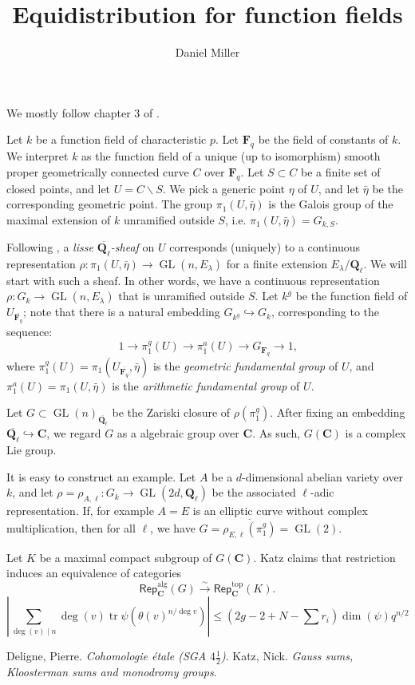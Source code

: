 \documentclass{article}
\title{Equidistribution for function fields}
\author{Daniel Miller}
\DeclareMathOperator{\gl}{GL}
\newcommand{\dC}{\mathbf{C}}
\newcommand{\dF}{\mathbf{F}}
\newcommand{\dQ}{\mathbf{Q}}
\begin{document}
\maketitle




We mostly follow chapter 3 of \cite{ka}.

Let $k$ be a function field of characteristic $p$. Let $\dF_q$ be the field of 
constants of $k$. We interpret $k$ as the function field of a unique (up to 
isomorphism) smooth proper geometrically connected curve $C$ over $\dF_q$. Let 
$S\subset C$ be a finite set of closed points, and let $U=C\smallsetminus S$. 
We pick a generic point $\eta$ of $U$, and let $\bar\eta$ be the corresponding 
geometric point. The group $\pi_1(U,\bar\eta)$ is the Galois group of the 
maximal extension of $k$ unramified outside $S$, i.e. 
$\pi_1(U,\bar\eta)=G_{k,S}$. 

Following \cite[2.2.4]{de}, a \emph{lisse $\overline{\dQ_\ell}$-sheaf} on $U$ 
corresponds (uniquely) to a continuous representation 
$\rho:\pi_1(U,\bar\eta) \to \gl(n,E_\lambda)$ for a finite extension 
$E_\lambda/\dQ_\ell$. We will start with such a sheaf. In other words, we have 
a continuous representation $\rho:G_k \to \gl(n,E_\lambda)$ that is unramified 
outside $S$. Let $k^g$ be the function field of $U_{\overline{\dF_q}}$; note 
that there is a natural embedding $G_{k^g}\hookrightarrow G_k$, corresponding 
to the sequence:
\[
  1 \to \pi_1^g(U) \to \pi_1^a(U) \to G_{\dF_q} \to 1\text{,}
\]
where $\pi_1^g(U)=\pi_1(U_{\overline{\dF_q}},\bar\eta)$ is the \emph{geometric 
fundamental group} of $U$, and $\pi_1^a(U)=\pi_1(U,\bar\eta)$ is the 
\emph{arithmetic fundamental group} of $U$. 

Let $G\subset \gl(n)_{\overline{\dQ_\ell}}$ be the Zariski closure 
of $\rho(\pi_1^g)$. After fixing an embedding 
$\overline{\dQ_\ell}\hookrightarrow\dC$, we regard $G$ as a algebraic group 
over $\dC$. As such, $G(\dC)$ is a complex Lie group. 

It is easy to construct an example. Let $A$ be a $d$-dimensional abelian variety 
over $k$, and let $\rho=\rho_{A,\ell}:G_k \to \gl(2 d,\dQ_\ell)$ be the 
associated $\ell$-adic representation. If, for example $A=E$ is an elliptic 
curve without complex multiplication, then for all $\ell$, we have 
$G=\overline{\rho_{E,\ell}(\pi_1^g)}=\gl(2)$. 

Let $K$ be a maximal compact subgroup of $G(\dC)$. Katz claims that restriction 
induces an equivalence of categories 
\[
  \mathsf{Rep}_\dC^\text{alg}(G) \xrightarrow\sim \mathsf{Rep}_\dC^\text{top}(K) \text{.}
\]
\[
  \left|\sum_{\deg(v)\mid n} \deg(v) \operatorname{tr} \psi\left(\theta(v)^{n/\deg v}\right)\right| \leqslant \left(2 g-2+N-\sum r_i\right) \dim(\psi) q^{n/2}
\]






\begin{thebibliography}{9}
   Deligne, Pierre. \emph{Cohomologie \'etale (SGA $4\frac 1 2$)}. 
   Katz, Nick. \emph{Gauss sums, Kloosterman sums and monodromy groups}. 
\end{thebibliography}
\end{document}
